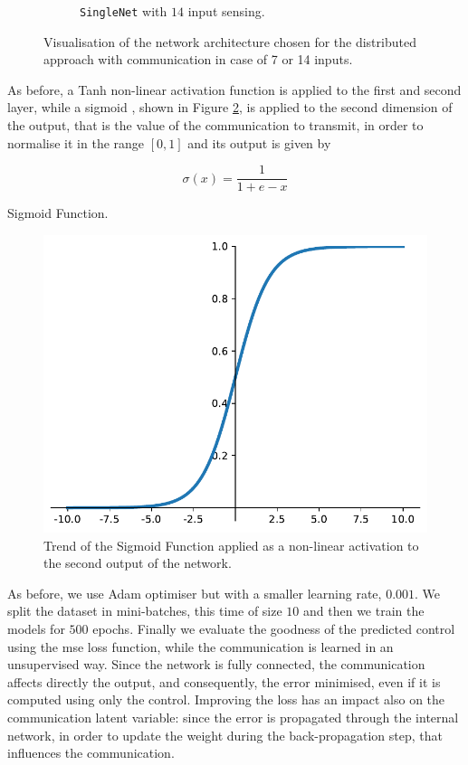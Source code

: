 \begin{figure}[!htb]
\begin{subfigure}[h]{0.495\textwidth}
		\caption{\texttt{SingleNet} with $14$ input sensing.}
	\end{subfigure}
	\caption[Network architectures for the distributed approach with 
	communication.]{Visualisation of the network architecture chosen for the 
		distributed approach with communication in case of 7 or 14 inputs.}
	\label{fig:singlenetcomm1}
\end{figure}

As before, a Tanh non-linear activation function is applied to the first and second 
layer, while a sigmoid \cite[see][]{han1995influence}, shown in Figure 
\ref{fig:sigmoid}, is applied to the second dimension of the output, that is the 
value of the communication to transmit, in order to normalise it in the range $[0, 
1]$ and its output is given by
\begin{Equation}[H]
	\centering
	\begin{equation}
	\sigma(x)= \frac{1}{1 + e - x}
	\end{equation}
	\caption{Sigmoid Function.}
	\label{eq:sigmoid}
\end{Equation}

\begin{figure}[!htb]
	\centering
	\includegraphics[width=.45\textwidth]{contents/images/sigmoid2}%
	\caption[Trend of the Sigmoid activation function.]{Trend of the Sigmoid 
		Function applied as a non-linear activation to the second output of the 
		network.}
	\label{fig:sigmoid}
\end{figure}

As before, we use Adam optimiser but with a smaller learning rate, $0.001$. 
We split the dataset in mini-batches, this time of size $10$ and then we train 
the models for $500$ epochs. 
Finally we evaluate the goodness of the predicted control using the \gls{mse} 
loss function, while the communication is learned in an unsupervised way.
Since the network is fully connected, the communication affects directly the 
output, and consequently, the error minimised, even if it is computed using 
only the control. Improving the loss has an impact also on the 
communication latent variable: since the error is propagated through the 
internal network, in order to update the weight during the back-propagation 
step, that influences the communication.

